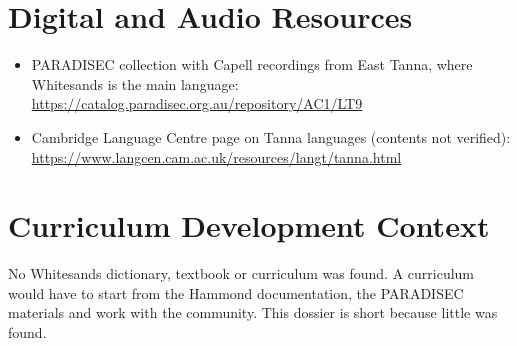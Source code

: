 \documentclass[12pt]{article}
\begin{document}
\section{Digital and Audio Resources}
\begin{itemize}
\item PARADISEC collection with Capell recordings from East Tanna, where Whitesands is the main language: \url{https://catalog.paradisec.org.au/repository/AC1/LT9}
\item Cambridge Language Centre page on Tanna languages (contents not verified): \url{https://www.langcen.cam.ac.uk/resources/langt/tanna.html}
\end{itemize}

\section{Curriculum Development Context}
No Whitesands dictionary, textbook or curriculum was found. A curriculum would have to start from the Hammond documentation, the PARADISEC materials and work with the community. This dossier is short because little was found.
\end{document}
